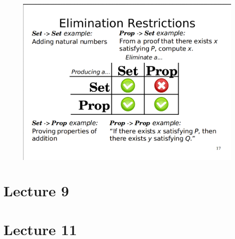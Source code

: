 \documentclass[paper=a4, fontsize=11pt]{scrartcl}
\numberwithin{equation}{section}		%
\numberwithin{figure}{section}			%
\numberwithin{table}{section}				%
\begin{document}
\begin{itemize}
{\begin{figure}
  \includegraphics[width=\linewidth]{elim_restrict.png}
\end{figure}

}
\end{itemize}

\section{Lecture 9}
\section{Lecture 11}
\end{document}
